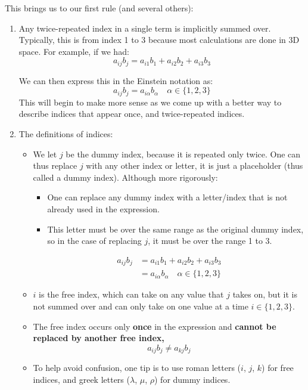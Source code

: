 This brings us to our first rule (and several others):
\begin{enumerate}[label=\textbf{Rule \arabic*}:, leftmargin=*, labelsep=1em]
    \item Any twice-repeated index in a single term is implicitly summed over. Typically, this is from index 1 to 3 because most calculations are done in 3D space. For example, if we had:
          \begin{equation}
              a_{ij} b_{j} = a_{i1}b_1 + a_{i2}b_2 + a_{i3}b_3
          \end{equation}

          We can then express this in the Einstein notation as:
          \begin{equation}
              a_{ij} b_{j} = a_{i\alpha} b_\alpha \quad \alpha \in \{1,2,3\}
          \end{equation}
          This will begin to make more sense as we come up with a better way to describe indices that appear once, and twice-repeated indices.

    \item The definitions of indices:
          \begin{itemize}
              \item We let $j$ be the dummy index, because it is repeated only twice. One can thus replace $j$ with any other index or letter, it is just a placeholder (thus called a dummy index). Although more rigorously:
                    \begin{itemize}
                        \item One can replace any dummy index with a letter/index that is not already used in the expression.
                        \item This letter must be over the same range as the original dummy index, so in the case of replacing $j$, it must be over the range 1 to 3.
                    \end{itemize}
                    \begin{align}
                        a_{ij} b_{j} & = a_{i1}b_1 + a_{i2}b_2 + a_{i3}b_3               \\
                                     & = a_{i\alpha} b_\alpha \quad \alpha \in \{1,2,3\}
                    \end{align}
              \item $i$ is the free index, which can take on any value that $j$ takes on, but it is not summed over and can only take on one value at a time $i \in \{1,2,3\}$.
              \item The free index occurs only \textbf{once} in the expression and \textbf{cannot be replaced by another free index,}
                    \begin{equation}
                        a_{ij} b_{j} \neq a_{kj} b_{j}
                    \end{equation}
              \item To help avoid confusion, one tip is to use roman letters ($i$, $j$, $k$) for free indices, and greek letters ($\lambda$, $\mu$, $\rho$) for dummy indices.


\end{itemize}
\end{enumerate}

